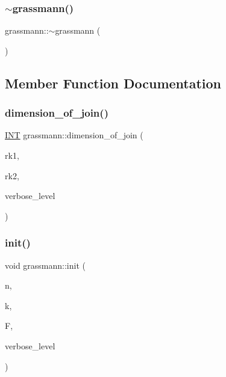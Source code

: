 \mbox{\label{classgrassmann_a369d95c437675f075f643b7e63a2a3a5}} 
\subsubsection{\texorpdfstring{$\sim$grassmann()}{~grassmann()}}
{\footnotesize\ttfamily grassmann\+::$\sim$grassmann (\begin{DoxyParamCaption}{ }\end{DoxyParamCaption})}



\subsection{Member Function Documentation}
\mbox{\label{classgrassmann_a9c98ddbb06e5cd89e97c6662172bf5c8}} 
\subsubsection{\texorpdfstring{dimension\+\_\+of\+\_\+join()}{dimension\_of\_join()}}
{\footnotesize\ttfamily \mbox{\hyperlink{galois_8h_a09fddde158a3a20bd2dcadb609de11dc}{I\+NT}} grassmann\+::dimension\+\_\+of\+\_\+join (\begin{DoxyParamCaption}\item[{\mbox{\hyperlink{galois_8h_a09fddde158a3a20bd2dcadb609de11dc}{I\+NT}}}]{rk1,  }\item[{\mbox{\hyperlink{galois_8h_a09fddde158a3a20bd2dcadb609de11dc}{I\+NT}}}]{rk2,  }\item[{\mbox{\hyperlink{galois_8h_a09fddde158a3a20bd2dcadb609de11dc}{I\+NT}}}]{verbose\+\_\+level }\end{DoxyParamCaption})}

\mbox{\label{classgrassmann_a2e8cf7b9f203254493d7c2607c17d498}} 
\subsubsection{\texorpdfstring{init()}{init()}}
{\footnotesize\ttfamily void grassmann\+::init (\begin{DoxyParamCaption}\item[{\mbox{\hyperlink{galois_8h_a09fddde158a3a20bd2dcadb609de11dc}{I\+NT}}}]{n,  }\item[{\mbox{\hyperlink{galois_8h_a09fddde158a3a20bd2dcadb609de11dc}{I\+NT}}}]{k,  }\item[{\mbox{\hyperlink{classfinite__field}{finite\+\_\+field}} $\ast$}]{F,  }\item[{\mbox{\hyperlink{galois_8h_a09fddde158a3a20bd2dcadb609de11dc}{I\+NT}}}]{verbose\+\_\+level }\end{DoxyParamCaption})}

